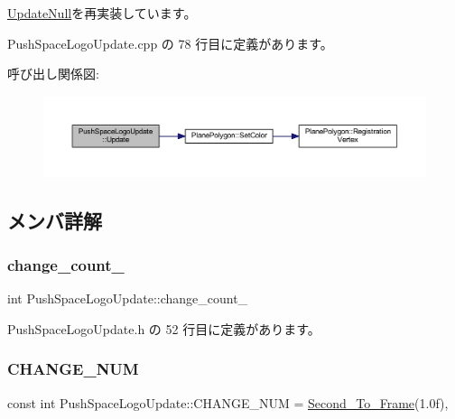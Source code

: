 \mbox{\hyperlink{class_update_null_a692f4f34e4ef35ca286a1d3606fdf473}{Update\+Null}}を再実装しています。



 Push\+Space\+Logo\+Update.\+cpp の 78 行目に定義があります。

呼び出し関係図\+:\nopagebreak
\begin{figure}[H]
\begin{center}
\leavevmode
\includegraphics[width=350pt]{class_push_space_logo_update_aa07fe6f6f4f072e1f81bc6708dd4727e_cgraph}
\end{center}
\end{figure}


\subsection{メンバ詳解}
\mbox{\label{class_push_space_logo_update_abb01ae1dcc8858389d98f95509b6dff7}} 
\subsubsection{\texorpdfstring{change\+\_\+count\+\_\+}{change\_count\_}}
{\footnotesize\ttfamily int Push\+Space\+Logo\+Update\+::change\+\_\+count\+\_\+\hspace{0.3cm}{\ttfamily [private]}}



 Push\+Space\+Logo\+Update.\+h の 52 行目に定義があります。

\mbox{\label{class_push_space_logo_update_a19a827951aba3490bd1fa2d78252838a}} 
\subsubsection{\texorpdfstring{C\+H\+A\+N\+G\+E\+\_\+\+N\+UM}{CHANGE\_NUM}}
{\footnotesize\ttfamily const int Push\+Space\+Logo\+Update\+::\+C\+H\+A\+N\+G\+E\+\_\+\+N\+UM = \mbox{\hyperlink{_time_to_frame_8h_acce6a90aebf40509e02a2c7c6cc3dc3d}{Second\+\_\+\+To\+\_\+\+Frame}}(1.\+0f)\hspace{0.3cm}{\ttfamily [static]}, {\ttfamily [private]}}



